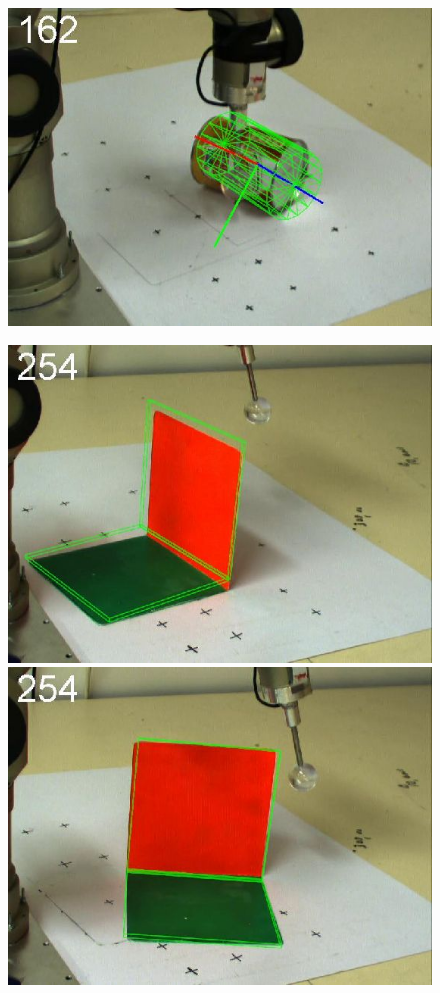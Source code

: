 \begin{figure}[htbp]
{\includegraphics[width=\imgAXwid]{images/A3_physx_39_3}
}
\centerline{
\includegraphics[width=\imgAXwid]{images/A1_2exp_667_4}
\includegraphics[width=\imgAXwid]{images/A1_2exp_876_4}
}
\end{figure}
